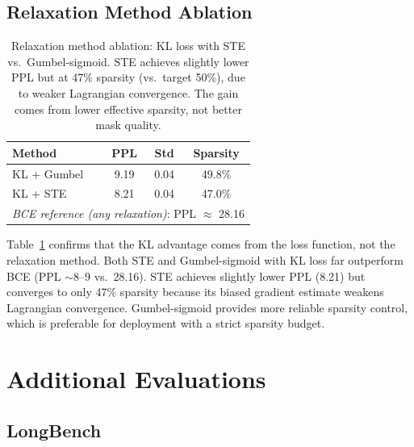 \documentclass[11pt,a4paper]{article}
\begin{document}
\subsection{Relaxation Method Ablation}

\begin{table}[t]
\centering
\caption{Relaxation method ablation: KL loss with STE vs.\ Gumbel-sigmoid. STE achieves slightly lower PPL but at 47\% sparsity (vs.\ target 50\%), due to weaker Lagrangian convergence. The gain comes from lower effective sparsity, not better mask quality.}
\label{tab:ste}
\small
\begin{tabular}{lccc}
\toprule
\textbf{Method} & \textbf{PPL} & \textbf{Std} & \textbf{Sparsity} \\
\midrule
KL + Gumbel & 9.19 & 0.04 & 49.8\% \\
KL + STE & 8.21 & 0.04 & 47.0\% \\
\midrule
\multicolumn{4}{l}{\emph{BCE reference (any relaxation)}: PPL $\approx$ 28.16} \\
\bottomrule
\end{tabular}
\end{table}

Table~\ref{tab:ste} confirms that the KL advantage comes from the loss function, not the relaxation method. Both STE and Gumbel-sigmoid with KL loss far outperform BCE (PPL ${\sim}$8--9 vs.\ 28.16). STE achieves slightly lower PPL (8.21) but converges to only 47\% sparsity because its biased gradient estimate weakens Lagrangian convergence. Gumbel-sigmoid provides more reliable sparsity control, which is preferable for deployment with a strict sparsity budget.

\section{Additional Evaluations}

\subsection{LongBench}
\end{document}
